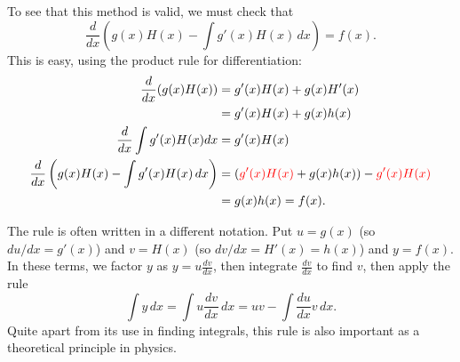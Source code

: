 \documentclass[a4paper]{book}
\newcommand{\RED}[1]{{\color{red}#1}}
\renewcommand{\:}{\colon}
\theoremstyle{definition}
\begin{document}
To see that this method is valid, we must check that
\[ \frac{d}{dx}\left(g(x)H(x) - \int g'(x)H(x)\, dx\right) = f(x). \]
This is easy, using the product rule for differentiation:
\begin{align*}
 \frac{d}{dx}(g(x)H(x)) &= g'(x)H(x) + g(x)H'(x) \\
  &= g'(x)H(x) + g(x) h(x) \\
 \frac{d}{dx}\int g'(x)H(x) dx &= g'(x) H(x) \\
 \frac{d}{dx}\left(g(x)H(x) - \int g'(x)H(x)\, dx\right) &= 
  (\RED{g'(x)H(x)} + g(x)h(x)) - \RED{g'(x)H(x)} \\
  &= g(x)h(x) = f(x).
\end{align*}

The rule is often written in a different notation.  Put $u=g(x)$ (so
$du/dx=g'(x)$) and $v=H(x)$ (so $dv/dx=H'(x)=h(x)$) and $y=f(x)$.  In
these terms, we factor $y$ as $y=u\frac{dv}{dx}$, then integrate
$\frac{dv}{dx}$ to find $v$, then apply the rule
\[ \int y\,dx = \int u\frac{dv}{dx}\, dx =
     uv - \int \frac{du}{dx} v\,dx.
\]
Quite apart from its use in finding integrals, this rule is also
important as a theoretical principle in physics.
\end{document}

